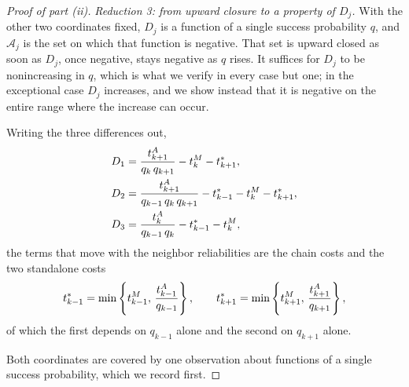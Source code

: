 \begin{proof}[Proof of part (ii)]
\emph{Reduction 3: from upward closure to a property of $D_j$.}
With the other two coordinates fixed, $D_j$ is a function of a single success probability $q$, and $\mathcal{A}_j$ is the set on which that function is negative.
That set is upward closed as soon as $D_j$, once negative, stays negative as $q$ rises.
It suffices for $D_j$ to be nonincreasing in $q$, which is what we verify in every case but one; in the exceptional case $D_j$ increases, and we show instead that it is negative on the entire range where the increase can occur.

Writing the three differences out,
\begin{align*}
D_1 &= \frac{t^{A}_{k+1}}{q_k\, q_{k+1}} - t^{M}_{k} - t^*_{k+1}, \\
D_2 &= \frac{t^{A}_{k+1}}{q_{k-1}\, q_k\, q_{k+1}} - t^*_{k-1} - t^{M}_{k} - t^*_{k+1}, \\
D_3 &= \frac{t^{A}_{k}}{q_{k-1}\, q_k} - t^*_{k-1} - t^{M}_{k},
\end{align*}
the terms that move with the neighbor reliabilities are the chain costs and the two standalone costs
\[ t^*_{k-1} = \min\left\{ t^{M}_{k-1},\, \frac{t^{A}_{k-1}}{q_{k-1}} \right\}, \qquad t^*_{k+1} = \min\left\{ t^{M}_{k+1},\, \frac{t^{A}_{k+1}}{q_{k+1}} \right\}, \]
of which the first depends on $q_{k-1}$ alone and the second on $q_{k+1}$ alone.

Both coordinates are covered by one observation about functions of a single success probability, which we record first.


\end{proof}
